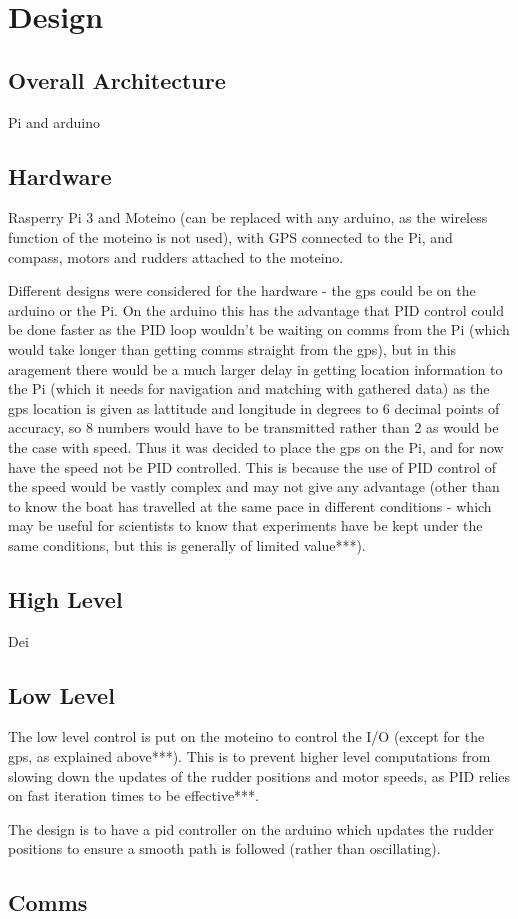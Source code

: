 \section{Design}
\subsection{Overall Architecture}
Pi and arduino

\subsection{Hardware}
Rasperry Pi 3 and Moteino (can be replaced with any arduino, as the wireless
function of the moteino is not used), with GPS connected to the Pi, and compass,
motors and rudders attached to the moteino. 

Different designs were considered for the hardware - the gps could be on the arduino or the Pi. On the arduino this has the advantage that PID control could be done faster as the PID loop wouldn't be waiting on comms from the Pi (which would take longer than getting comms straight from the gps), but in this aragement there would be a much larger delay in getting location information to the Pi (which it needs for navigation and matching with gathered data) as the gps location is given as lattitude and longitude in degrees to 6 decimal points
of accuracy, so 8 numbers would have to be transmitted rather than 2 as would be the case with speed. Thus it was decided to place the gps on the Pi, and for now have the speed not be PID controlled. This is because the use of PID control of the speed would be vastly complex and may not give any advantage (other than to know the boat has travelled at the same pace in different conditions - which may be useful for scientists to know that experiments have be kept under the same conditions, but this is generally of limited value***).



\subsection{High Level}
Dei

\subsection{Low Level}
The low level control is put on the moteino to control the I/O (except for the gps, as explained above***). This is to prevent higher level computations from slowing down the updates of the rudder positions and motor speeds, as PID relies on fast iteration times to be effective***. 

The design is to have a pid controller on the arduino which updates the rudder positions to ensure a smooth path is followed (rather than oscillating).

\subsection{Comms}